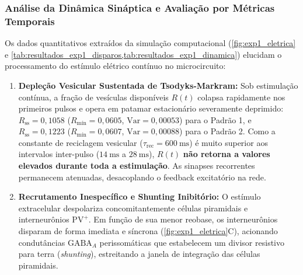 \documentclass[11pt,a4paper,article,brazil]{abntex2}
\begin{document}



\subsubsection{Análise da Dinâmica Sináptica e Avaliação por Métricas Temporais}
Os dados quantitativos extraídos da simulação computacional (\cref{fig:exp1_eletrica} e \cref{tab:resultados_exp1_disparos,tab:resultados_exp1_dinamica}) elucidam o processamento do estímulo elétrico contínuo no microcircuito:
\begin{enumerate}
    \item \textbf{Depleção Vesicular Sustentada de Tsodyks-Markram:} Sob estimulação contínua, a fração de vesículas disponíveis $R(t)$ colapsa rapidamente nos primeiros pulsos e opera em patamar estacionário severamente deprimido: $R_{\text{ss}} = 0{,}1058$ ($R_{\text{mín}} = 0{,}0605$, $\text{Var} = 0{,}00053$) para o Padrão 1, e $R_{\text{ss}} = 0{,}1223$ ($R_{\text{mín}} = 0{,}0607$, $\text{Var} = 0{,}00088$) para o Padrão 2. Como a constante de reciclagem vesicular ($\tau_{\text{rec}} = \qty{600}{\milli\second}$) é muito superior aos intervalos inter-pulso ($\qty{14}{\milli\second}$ a $\qty{28}{\milli\second}$), $R(t)$ \textbf{não retorna a valores elevados durante toda a estimulação}. As sinapses recorrentes permanecem atenuadas, desacoplando o feedback excitatório na rede.
    \item \textbf{Recrutamento Inespecífico e Shunting Inibitório:} O estímulo extracelular despolariza concomitantemente células piramidais e interneurônios $\text{PV}^+$. Em função de sua menor reobase, os interneurônios disparam de forma imediata e síncrona (\cref{fig:exp1_eletrica}C), acionando condutâncias $\text{GABA}_A$ perissomáticas que estabelecem um divisor resistivo para terra (\emph{shunting}), estreitando a janela de integração das células piramidais.

\end{enumerate}
\end{document}
